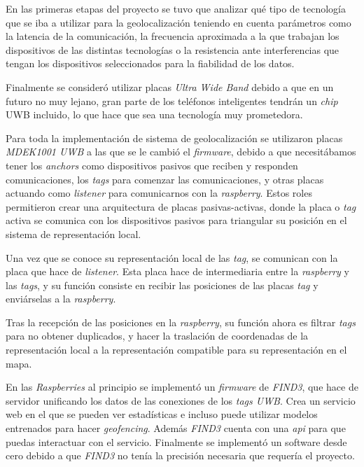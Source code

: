 En las primeras etapas del proyecto se tuvo que analizar qué tipo de tecnología que se iba a utilizar para la geolocalización teniendo en cuenta parámetros como
la latencia de la comunicación, la frecuencia aproximada a la que trabajan los dispositivos de las distintas tecnologías o la resistencia ante interferencias que tengan los dispositivos seleccionados para la fiabilidad de los datos.

Finalmente se consideró utilizar placas \textit{Ultra Wide Band} debido a que en un futuro no muy lejano, gran parte de los teléfonos inteligentes tendrán un \textit{chip} UWB incluido, lo que hace que sea una tecnología muy prometedora.

Para toda la implementación de sistema de geolocalización se utilizaron placas \textit{MDEK1001 UWB} a las que se le cambió el \textit{firmware}, debido a que necesitábamos tener los \textit{anchors} como dispositivos pasivos que reciben y responden comunicaciones, los \textit{tags} para comenzar las comunicaciones, y otras placas actuando como \textit{listener} para comunicarnos con la \textit{raspberry}. Estos roles permitieron crear una arquitectura de placas pasivas-activas, donde la placa o \textit{tag} activa se comunica con los dispositivos pasivos para triangular su posición en el sistema de representación local.

Una vez que se conoce su representación local de las \textit{tag}, se comunican con la placa que hace de \textit{listener}. Esta placa hace de intermediaria entre la \textit{raspberry} y las \textit{tags}, y su función consiste en recibir las posiciones de las placas \textit{tag} y enviárselas a la \textit{raspberry}.

Tras la recepción de las posiciones en la \textit{raspberry}, su función ahora es filtrar \textit{tags} para no obtener duplicados, y hacer la traslación de coordenadas de la representación local a la representación compatible para su representación en el mapa.


En las \textit{Raspberries} al principio se implementó un \textit{firmware} de \textit{FIND3}, que hace de servidor unificando los datos de las conexiones de los \textit{tags UWB}. Crea un servicio web en el que se pueden ver estadísticas e incluso puede utilizar modelos entrenados para hacer \textit{geofencing}. Además \textit{FIND3} cuenta con una \textit{api} para que puedas interactuar con el servicio. Finalmente se implementó un software desde cero debido a que \textit{FIND3} no tenía la precisión necesaria que requería el proyecto.


